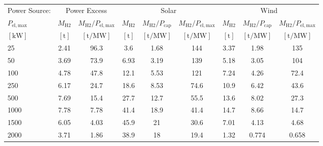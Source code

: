 \begin{table}
\label{tab: VaryElectrolyser}
\begin{tabular}{l|cc|ccc|ccc}
\toprule
Power Source: & \multicolumn{2}{|c}{Power Excess} & \multicolumn{3}{|c}{Solar} & \multicolumn{3}{|c}{Wind} \\
$P_{\mathrm{el,max}}$ & $M_{\mathrm{H2}}$ & $M_{\mathrm{H2}}/P_{\mathrm{el,max}}$ & $M_{\mathrm{H2}}$ & $M_{\mathrm{H2}}/P_{\mathrm{cap}}$ & $M_{\mathrm{H2}}/P_{\mathrm{el,max}}$ & $M_{\mathrm{H2}}$ & $M_{\mathrm{H2}}/P_{\mathrm{cap}}$ & $M_{\mathrm{H2}}/P_{\mathrm{el,max}}$ \\
$\left[\mathrm{kW}\right]$ & $\left[\mathrm{t}\right]$ & $\left[\mathrm{t/MW}\right]$ & $\left[\mathrm{t}\right]$ & $\left[\mathrm{t/MW}\right]$ & $\left[\mathrm{t/MW}\right]$ & $\left[\mathrm{t}\right]$ & $\left[\mathrm{t/MW}\right]$ & $\left[\mathrm{t/MW}\right]$ \\
\midrule
25 & 2.41 & 96.3 & 3.6 & 1.68 & 144 & 3.37 & 1.98 & 135 \\
50 & 3.69 & 73.9 & 6.93 & 3.19 & 139 & 5.18 & 3.05 & 104 \\
100 & 4.78 & 47.8 & 12.1 & 5.53 & 121 & 7.24 & 4.26 & 72.4 \\
250 & 6.17 & 24.7 & 18.6 & 8.53 & 74.6 & 10.9 & 6.42 & 43.6 \\
500 & 7.69 & 15.4 & 27.7 & 12.7 & 55.5 & 13.6 & 8.02 & 27.3 \\
1000 & 7.78 & 7.78 & 41.4 & 18.9 & 41.4 & 14.7 & 8.66 & 14.7 \\
1500 & 6.05 & 4.03 & 45.9 & 21 & 30.6 & 7.01 & 4.13 & 4.68 \\
2000 & 3.71 & 1.86 & 38.9 & 18 & 19.4 & 1.32 & 0.774 & 0.658 \\
\bottomrule
\end{tabular}
\end{table}
